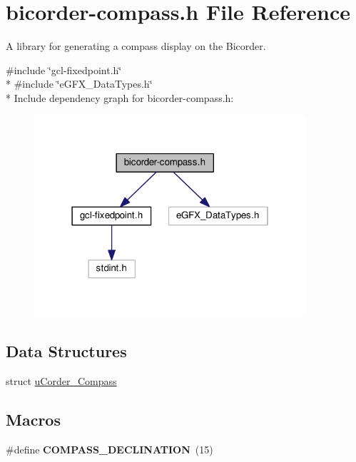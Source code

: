 \hypertarget{bicorder-compass_8h}{}\section{bicorder-\/compass.h File Reference}
\label{bicorder-compass_8h}


A library for generating a compass display on the Bicorder.  


{\ttfamily \#include \char`\"{}gcl-\/fixedpoint.\+h\char`\"{}}\\*
{\ttfamily \#include \char`\"{}e\+G\+F\+X\+\_\+\+Data\+Types.\+h\char`\"{}}\\*
Include dependency graph for bicorder-\/compass.h\+:
\nopagebreak
\begin{figure}[H]
\begin{center}
\leavevmode
\includegraphics[width=286pt]{bicorder-compass_8h__incl}
\end{center}
\end{figure}
\subsection*{Data Structures}
\begin{DoxyCompactItemize}
\item 
struct \hyperlink{structuCorder__Compass}{u\+Corder\+\_\+\+Compass}
\end{DoxyCompactItemize}
\subsection*{Macros}
\begin{DoxyCompactItemize}
\item 
\#define {\bfseries C\+O\+M\+P\+A\+S\+S\+\_\+\+D\+E\+C\+L\+I\+N\+A\+T\+I\+ON}~(15)\hypertarget{bicorder-compass_8h_ae36b72028ffc628f320aba81b702036d}{}\label{bicorder-compass_8h_ae36b72028ffc628f320aba81b702036d}

\end{DoxyCompactItemize}
